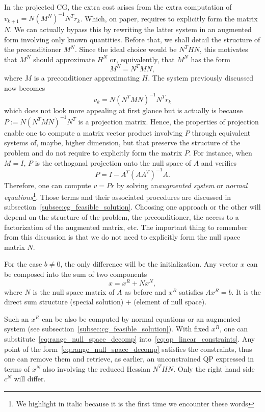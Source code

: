 \documentclass[10pt]{article}
\numberwithin{equation}{section}
\begin{document}
	In the projected CG, the extra cost arises from the extra computation of $v_{k+1}= N{(M^N)}^{-1}N^Tr_{k}$. Which, on paper, requires to explicitly form the matrix $N$. We can actually bypass this by rewriting the latter system in an augmented form involving only known quantities. Before that, we shall detail the structure of the preconditioner $M^N$. Since the ideal choice would be $N^THN$, this motivates that $M^N$ should approximate $H^N$ or, equivalently, that $M^N$ has the form 
	\[M^N=N^TMN,\]
	where $M$ is a preconditioner approximating $H$. The system previously discussed now becomes
	 \[v_k = N(N^TMN)^{-1}N^Tr_k\]
	 which does not look more appealing at first glance but is actually is because $P := N(N^TMN)^{-1}N^T$ is a projection matrix. Hence, the properties of projection enable one to compute a matrix vector product involving $P$ through equivalent systems of, maybe, higher dimension, but that preserve the structure of the problem and do not require to explicitly form the matrix $P$. For instance, when $M=I$, $P$ is the orthogonal projection onto the null space of $A$ and verifies
	 \[P = I-A^T(AA^T)^{-1}A.\]
	 Therefore, one can compute $v=Pr$ by solving an\textit{augmented system} or \textit{normal equations}\footnote{We highlight in italic because it is the first time we encounter these words}. Those terms and their associated procedures are discussed in subsection~\ref{subsec:cg_feasible_solution}.
	 Choosing one approach or the other will depend on the structure of the problem, the preconditioner, the access to a factorization of the augmented matrix, etc. The important thing to remember from this discussion is that we do not need to explicitly form the null space matrix $N$.
	 
	 For the case $b\neq 0$, the only difference will be the initialization. Any vector $x$ can be composed into the sum of two components
	 \begin{equation}\label{eq:range_null_space_decomp}
	 	x = x^R + Nx^N,
	 \end{equation}
	 where $N$ is the null space matrix of $A$ as before and $x^R$ satisfies $Ax^R=b$. It is the direct sum structure (special solution) + (element of null space). 
	 
	 Such an $x^R$ can be also be computed by normal equations or an augmented system (see subsection~\ref{subsec:cg_feasible_solution}). With fixed $x^R$, one can substitute~\eqref{eq:range_null_space_decomp} into~\eqref{eq:qp_linear_constraints}. Any point of the form~\eqref{eq:range_null_space_decomp} satisfies the constraints, thus one can remove them and retrieve, as earlier, an unconstrained QP expressed in terms of $x^N$ also involving the reduced Hessian $N^THN$. Only the right hand side $c^N$ will differ.
	 
\end{document}
